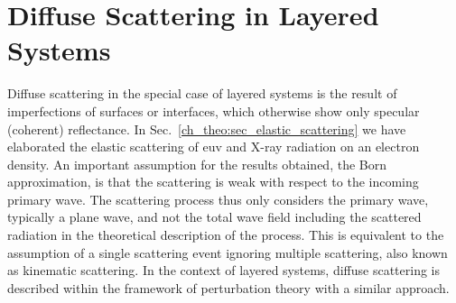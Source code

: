 \section{Diffuse Scattering in Layered Systems}
Diffuse scattering in the special case of layered systems is the result of imperfections of surfaces or interfaces, which otherwise show only specular (coherent) reflectance. In Sec.~\ref{ch_theo:sec_elastic_scattering} we have elaborated the elastic scattering of \gls{euv} and X-ray radiation on an electron density. An important assumption for the results obtained, the Born approximation, is that the scattering is weak with respect to the incoming primary wave. The scattering process thus only considers the primary wave, typically a plane wave, and not the total wave field including the scattered radiation in the theoretical description of the process. This is equivalent to the assumption of a single scattering event ignoring multiple scattering, also known as kinematic scattering. In the context of layered systems, diffuse scattering is described within the framework of perturbation theory with a similar approach.

